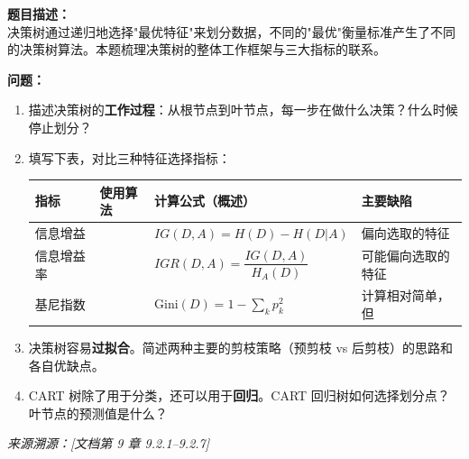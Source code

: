 \documentclass[a4paper,11pt]{ctexart}
\begin{document}
\begin{problembox}
    \textbf{题目描述：}\\
    决策树通过递归地选择"最优特征"来划分数据，不同的"最优"衡量标准产生了不同的决策树算法。本题梳理决策树的整体工作框架与三大指标的联系。

    \vspace{0.3cm}
    \textbf{问题：}
    \begin{enumerate}[(1)]
        \item 描述决策树的\textbf{工作过程}：从根节点到叶节点，每一步在做什么决策？什么时候停止划分？

        \item 填写下表，对比三种特征选择指标：

        \begin{center}
        \begin{tabular}{p{2.8cm} p{2.8cm} p{3.5cm} p{3.5cm}}
            \toprule
            指标 & 使用算法 & 计算公式（概述） & 主要缺陷 \\
            \midrule
            信息增益 & \underline{\hspace{2cm}} & $IG(D,A) = H(D) - H(D|A)$ & 偏向选取\underline{\hspace{1.5cm}}的特征 \\[1.5em]
            信息增益率 & \underline{\hspace{2cm}} & $IGR(D,A) = \dfrac{IG(D,A)}{H_A(D)}$ & 可能偏向选取\underline{\hspace{1.5cm}}的特征 \\[1.5em]
            基尼指数 & \underline{\hspace{2cm}} & $\text{Gini}(D) = 1 - \sum_k p_k^2$ & 计算相对简单，但\underline{\hspace{1.5cm}} \\
            \bottomrule
        \end{tabular}
        \end{center}

        \item 决策树容易\textbf{过拟合}。简述两种主要的剪枝策略（预剪枝 vs 后剪枝）的思路和各自优缺点。

        \item CART 树除了用于分类，还可以用于\textbf{回归}。CART 回归树如何选择划分点？叶节点的预测值是什么？
    \end{enumerate}

    \vspace{0.2cm}
    {\color{gray}\small\textit{来源溯源：[文档第 9 章 9.2.1--9.2.7]}}
\end{problembox}
\end{document}
